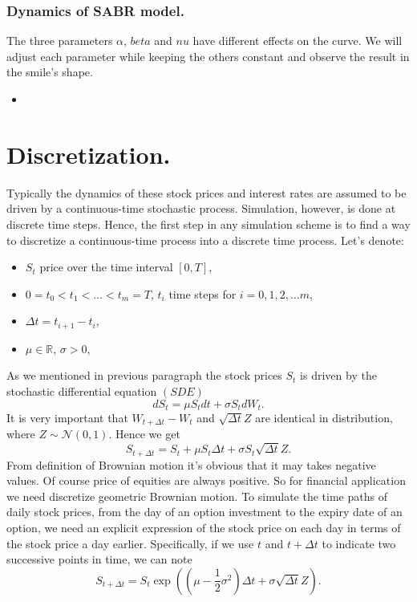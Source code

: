 \documentclass{book}
\begin{document}
\subsubsection{Dynamics of SABR model.}
The three parameters $\alpha$, $beta$ and $nu$ have different effects on the curve. We will adjust each parameter while keeping the others constant and observe the result in the smile’s shape.
\begin{itemize}
\item
\end{itemize}

\section{Discretization.}
Typically the dynamics of these stock prices and interest rates are assumed to be driven by a continuous-time stochastic process. Simulation,
however, is done at discrete time steps. Hence, the first step in any simulation scheme is to find a way to discretize a continuous-time process into a discrete time process.
Let's denote:
\begin{itemize}
\item $S_{t}$ price over the time interval $[0,T]$,
\item $0=t_{0}<t_{1}<\dots<t_{m}=T$, $t_{i}$ time steps for $i=0,1,2,\dots m$,
\item $\Delta t=t_{i+1}-t_{i}$, 
\item $\mu\in\mathbb{R}$, $\sigma>0$, 
\end{itemize}
As we mentioned in previous paragraph the stock prices $S_{t}$ is driven by the stochastic differential
equation $(SDE)$
$$
dS_{t}=\mu S_{t}dt+\sigma S_{t} dW_{t}.
$$
It is very important that $W_{t+\Delta t}-W_{t}$ and $\sqrt{\Delta t}Z$ are identical in distribution, where $Z\sim\mathcal{N}(0,1)$. Hence we get
\begin{equation}
\nonumber
S_{t+\Delta t}=S_{t}+\mu S_{t}\Delta t+\sigma S_{t}\sqrt{\Delta t}Z.
\end{equation}
From definition of Brownian motion it's obvious that it may takes negative values. Of course price of equities are always positive. So for financial application we need discretize geometric Brownian motion. To simulate the time paths of daily stock prices, from the day of an option investment to the expiry date of an option, we need an explicit expression of the stock price on each day in terms of the stock price a day earlier. Specifically, if we use $t$ and $t+\Delta t$ to indicate two successive points in time, we can note
\begin{equation}
S_{t+\Delta t}=S_{t}\exp\left((\mu-\frac{1}{2}\sigma^{2})\Delta t+\sigma\sqrt{\Delta t}Z\right).
\end{equation}
\end{document}
